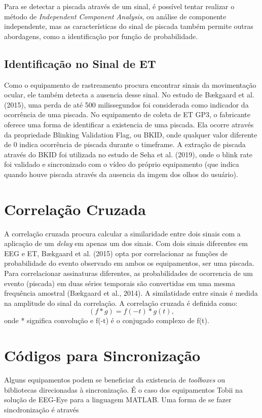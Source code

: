 Para se detectar a piscada através de um sinal, é possível tentar realizar o método de \textit{Independent Component Analysis}, ou análise de 
componente independente, mas as características do sinal de piscada também permite outras abordagens, como a identificação por função de probabilidade.


\subsection{Identificação no Sinal de ET}
Como o equipamento de rastreamento procura encontrar sinais da movimentação ocular, ele também detecta a ausencia desse sinal. No estudo 
de Bækgaard et al. (2015), uma perda de até 500 milissegundos foi considerada como indicador da ocorrência de uma piscada. No equipamento de coleta de ET GP3, 
o fabricante oferece uma forma de identificar a existencia de uma piscada. Ela ocorre através da propriedade Blinking Validation Flag, ou BKID, onde qualquer 
valor diferente de 0 indica ocorrência de piscada durante o timeframe. A extração de piscada através do BKID foi utilizada no estudo de Seha et al. (2019), 
onde o blink rate foi validado e sincronizado com o vídeo do próprio equipamento (que indica quando houve piscada através da ausencia da imgem dos olhos do usuário).

\section{Correlação Cruzada}
A correlação cruzada procura calcular a similaridade entre dois sinais com a aplicação de um \textit{delay} em apenas um dos sinais.
Com dois sinais diferentes em EEG e ET, Bækgaard et al. (2015) opta por correlacionar as funções de probabilidade do evento observado em 
ambos os equipamentos, ser uma piscada. 
Para correlacionar assinaturas diferentes, as probabilidades de ocorrencia de um evento (piscada) em duas séries temporais são convertidas em uma mesma frequência amostral (Bækgaard et al., 2014).
A similatidade entre sinais é medida na amplitude do sinal da correlação. A correlação cruzada é definida como:
\begin{equation}\label{eq:correlação cruzada}
    (f * g) = f(-t)*g(t), 
    \end{equation}
onde * significa convolução e f(-t) é o conjugado complexo de f(t).


\section{Códigos para Sincronização}
Alguns equipamentos podem se beneficiar da existencia de \textit{toolboxes} ou bibliotecas direcionadas à sincronização. É o caso 
dos equipamentos Tobii na solução de EEG-Eye para a linguagem MATLAB. Uma forma de se fazer sincdronização é através 

